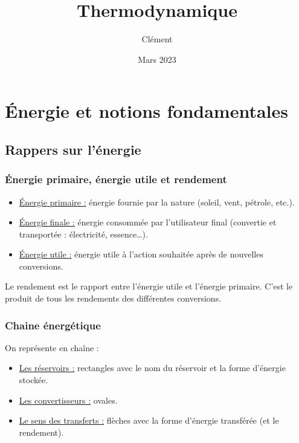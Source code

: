 \documentclass[13pt, twoside, a4paper, french]{report}
\newcommand*{\getSubject}{Thermodynamique}
\begin{document}
\title{\getSubject}
\author{Clément }
\date{Mars 2023}
\tableofcontents


\chapter{Énergie et notions fondamentales}\label{ch:energie-et-notions-fondamentales-de-thermodynamique}


    \section{Rappers sur l'énergie}\label{sec:rappers-sur-l'energie}

        \subsection{Énergie primaire, énergie utile et rendement}\label{subsec:energie-primaire-energie-utile-et-rendement}

            \begin{itemize}
                \item \underline{Énergie primaire :} énergie fournie par la nature (soleil, vent, pétrole, etc.).
                \item \underline{Énergie finale :} énergie consommée par l'utilisateur final (convertie et transportée : électricité, essence\ldots).
                \item \underline{Énergie utile :} énergie utile à l'action souhaitée après de nouvelles conversions.
            \end{itemize}
            Le rendement est le rapport entre l'énergie utile et l'énergie primaire.
            C'est le produit de tous les rendements des différentes conversions.

        \subsection{Chaine énergétique}\label{subsec:chaine-energetique}

            On représente en chaîne :
            \begin{itemize}
                \item \underline{Les réservoirs :} rectangles avec le nom du réservoir et la forme d'énergie stockée.
                \item \underline{Les convertisseurs :} ovales.
                \item \underline{Le sens des transferts :} flèches avec la forme d'énergie transférée (et le rendement).
            \end{itemize}
\end{document}

